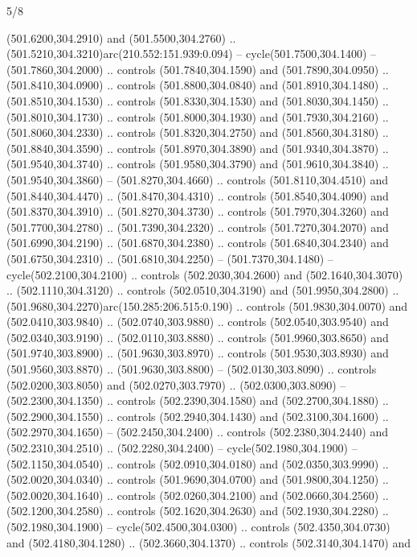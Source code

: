 \begin{flagdescription}{5/8}
\begin{scope}[xshift=0.5\flaglength,yshift=0.5\flagwidth,scale=\flagwidth/475.63]
\begin{scope}[y=0.8pt, x=0.8pt, yscale=-1, xscale=1,shift={(-450,-300)}]
\begin{scope}[cm={{1.0,0.0,0.0,1.0,(-0.0002,0.12556)}},cm={{1.0,0.0,0.0,1.0,(0.00179,0.0)}}]
\begin{scope}[cm={{1.11592,0.0,0.0,1.11592,(-106.89933,-41.77764)}}]
\begin{scope}[draw=black,fill=cfff]
\begin{scope}[fill=black]
  (501.6200,304.2910) and (501.5500,304.2760) ..
  (501.5210,304.3210)arc(210.552:151.939:0.094) -- cycle(501.7500,304.1400) --
  (501.7860,304.2000) .. controls (501.7840,304.1590) and (501.7890,304.0950) ..
  (501.8410,304.0900) .. controls (501.8800,304.0840) and (501.8910,304.1480) ..
  (501.8510,304.1530) .. controls (501.8330,304.1530) and (501.8030,304.1450) ..
  (501.8010,304.1730) .. controls (501.8000,304.1930) and (501.7930,304.2160) ..
  (501.8060,304.2330) .. controls (501.8320,304.2750) and (501.8560,304.3180) ..
  (501.8840,304.3590) .. controls (501.8970,304.3890) and (501.9340,304.3870) ..
  (501.9540,304.3740) .. controls (501.9580,304.3790) and (501.9610,304.3840) ..
  (501.9540,304.3860) -- (501.8270,304.4660) .. controls (501.8110,304.4510) and
  (501.8440,304.4470) .. (501.8470,304.4310) .. controls (501.8540,304.4090) and
  (501.8370,304.3910) .. (501.8270,304.3730) .. controls (501.7970,304.3260) and
  (501.7700,304.2780) .. (501.7390,304.2320) .. controls (501.7270,304.2070) and
  (501.6990,304.2190) .. (501.6870,304.2380) .. controls (501.6840,304.2340) and
  (501.6750,304.2310) .. (501.6810,304.2250) -- (501.7370,304.1480) --
  cycle(502.2100,304.2100) .. controls (502.2030,304.2600) and
  (502.1640,304.3070) .. (502.1110,304.3120) .. controls (502.0510,304.3190) and
  (501.9950,304.2800) .. (501.9680,304.2270)arc(150.285:206.515:0.190) ..
  controls (501.9830,304.0070) and (502.0410,303.9840) .. (502.0740,303.9880) ..
  controls (502.0540,303.9540) and (502.0340,303.9190) .. (502.0110,303.8880) ..
  controls (501.9960,303.8650) and (501.9740,303.8900) .. (501.9630,303.8970) ..
  controls (501.9530,303.8930) and (501.9560,303.8870) .. (501.9630,303.8800) --
  (502.0130,303.8090) .. controls (502.0200,303.8050) and (502.0270,303.7970) ..
  (502.0300,303.8090) -- (502.2300,304.1350) .. controls (502.2390,304.1580) and
  (502.2700,304.1880) .. (502.2900,304.1550) .. controls (502.2940,304.1430) and
  (502.3100,304.1600) .. (502.2970,304.1650) -- (502.2450,304.2400) .. controls
  (502.2380,304.2440) and (502.2310,304.2510) .. (502.2280,304.2400) --
  cycle(502.1980,304.1900) -- (502.1150,304.0540) .. controls
  (502.0910,304.0180) and (502.0350,303.9990) .. (502.0020,304.0340) .. controls
  (501.9690,304.0700) and (501.9800,304.1250) .. (502.0020,304.1640) .. controls
  (502.0260,304.2100) and (502.0660,304.2560) .. (502.1200,304.2580) .. controls
  (502.1620,304.2630) and (502.1930,304.2280) .. (502.1980,304.1900) --
  cycle(502.4500,304.0300) .. controls (502.4350,304.0730) and
  (502.4180,304.1280) .. (502.3660,304.1370) .. controls (502.3140,304.1470) and

\end{scope}
\end{scope}
\end{scope}
\end{scope}
\end{scope}
\end{scope}
\end{flagdescription}

